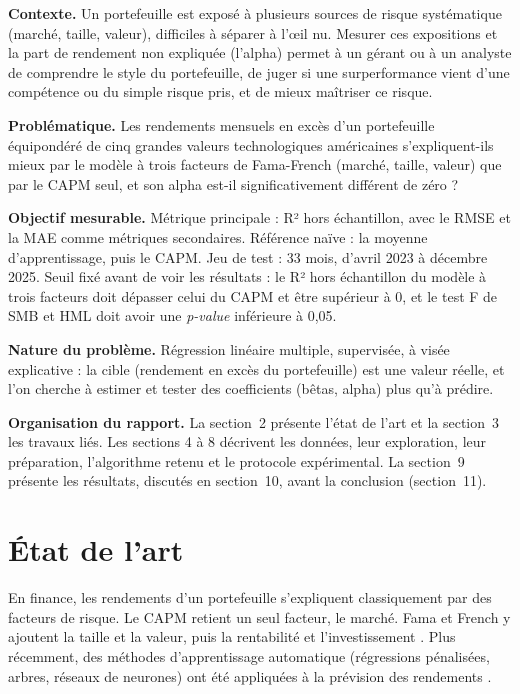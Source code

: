 \documentclass[11pt,a4paper]{article}
\begin{document}
\textbf{Contexte.} Un portefeuille est exposé à plusieurs sources de risque systématique (marché, taille, valeur), difficiles à séparer à l'œil nu. Mesurer ces expositions et la part de rendement non expliquée (l'alpha) permet à un gérant ou à un analyste de comprendre le style du portefeuille, de juger si une surperformance vient d'une compétence ou du simple risque pris, et de mieux maîtriser ce risque.

\textbf{Problématique.} Les rendements mensuels en excès d'un portefeuille équipondéré de cinq grandes valeurs technologiques américaines s'expliquent-ils mieux par le modèle à trois facteurs de Fama-French (marché, taille, valeur) que par le CAPM seul, et son alpha est-il significativement différent de zéro ?

\textbf{Objectif mesurable.} Métrique principale : R² hors échantillon, avec le RMSE et la MAE comme métriques secondaires. Référence naïve : la moyenne d'apprentissage, puis le CAPM. Jeu de test : 33 mois, d'avril 2023 à décembre 2025. Seuil fixé avant de voir les résultats : le R² hors échantillon du modèle à trois facteurs doit dépasser celui du CAPM et être supérieur à 0, et le test F de SMB et HML doit avoir une \textit{p-value} inférieure à 0,05.

\textbf{Nature du problème.} Régression linéaire multiple, supervisée, à visée explicative : la cible (rendement en excès du portefeuille) est une valeur réelle, et l'on cherche à estimer et tester des coefficients (bêtas, alpha) plus qu'à prédire.

\textbf{Organisation du rapport.} La section~2 présente l'état de l'art et la section~3 les travaux liés. Les sections 4 à 8 décrivent les données, leur exploration, leur préparation, l'algorithme retenu et le protocole expérimental. La section~9 présente les résultats, discutés en section~10, avant la conclusion (section~11).

\section{État de l'art}

En finance, les rendements d'un portefeuille s'expliquent classiquement par des facteurs de risque. Le CAPM \cite{sharpe} retient un seul facteur, le marché. Fama et French \cite{ff93} y ajoutent la taille et la valeur, puis la rentabilité et l'investissement \cite{ff15}. Plus récemment, des méthodes d'apprentissage automatique (régressions pénalisées, arbres, réseaux de neurones) ont été appliquées à la prévision des rendements \cite{gku}.
\end{document}
